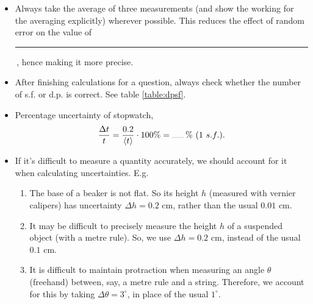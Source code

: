 \documentclass[oneside]{book}
\begin{document}
\begin{itemize}
\begin{table}[H]
\begin{tabular}{|Sc|Sc|}
            \hline
            \(Z=aX\pm bY\) & \(\Delta Z=\lvert a \rvert\Delta X+\lvert b \rvert\Delta Y\)\\
            \hline
            \(Z=cX^aY^b\) & \(\dfrac{\Delta Z}{Z}=\lvert a \rvert\dfrac{\Delta X}{X}+\lvert b \rvert\dfrac{\Delta Y}{Y}\)\\
            \hline
        \end{tabular}
        \caption{Uncertainty rules}
        \label{table:uncertainty-rules}
    \end{table}
    \item Always take the average of three measurements (and show the working for the averaging explicitly) wherever possible. This reduces the effect of random error on the value of \rule{0.5cm}{0.05mm}\,, hence making it more precise.
    \item After finishing calculations for a question, always check whether the number of s.f. or d.p. is correct. See table \ref{table:dpsf}.
    \item Percentage uncertainty of stopwatch,
    \[\frac{\Delta t}{t}=\frac{0.2}{\langle t \rangle}\cdot 100\%=\rule{0.5cm}{0.05mm}\,\%\ (1\ s.f.).\]
    \item If it's difficult to measure a quantity accurately, we should account for it when calculating uncertainties. E.g. 
    \begin{enumerate}
        \item The base of a beaker is not flat. So its height \(h\) (measured with vernier calipers) has uncertainty \(\Delta h=0.2\) cm, rather than the usual \(0.01\) cm.
        \item It may be difficult to precisely measure the height \(h\) of a suspended object (with a metre rule). So, we use \(\Delta h=0.2\) cm, instead of the usual \(0.1\) cm. 
        \item It is difficult to maintain protraction when measuring an angle \(\theta\) (freehand) between, say, a metre rule and a string. Therefore, we account for this by taking \(\Delta\theta=3^\circ\), in place of the usual \(1^\circ\).
    \end{enumerate}
\end{itemize}
\end{document}
